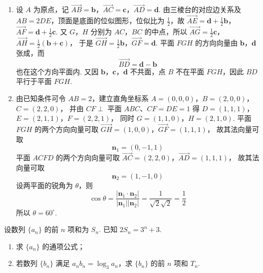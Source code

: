 \begin{solution}
\begin{enumerate}
\item 设 \(A\) 为原点，记
\(\overrightarrow{AB}=\mathbf b\)，\(\overrightarrow{AC}=\mathbf c\)，\(\overrightarrow{AD}=\mathbf d\).
由三棱台的对应边关系及 \(AB=2DE\)，顶面是底面的位似图形，位似比为 \(\frac12\)，故
\(\overrightarrow{AE}=\mathbf d+\frac12\mathbf b\)，\(\overrightarrow{AF}=\mathbf d+\frac12\mathbf c\).
又 \(G\)，\(H\) 分别为 \(AC\)，\(BC\) 的中点，所以
\(\overrightarrow{AG}=\frac12\mathbf c\)，\(\overrightarrow{AH}=\frac12(\mathbf b+\mathbf c)\)，
于是
\(\overrightarrow{GH}=\frac12\mathbf b\)，\(\overrightarrow{GF}=\mathbf d\).
平面 \(FGH\) 的方向向量由 \(\mathbf b\)，\(\mathbf d\) 张成，而
\[
\overrightarrow{BD}=\mathbf d-\mathbf b
\]
也在这个方向平面内. 又因 \(\mathbf b\)，\(\mathbf c\)，\(\mathbf d\) 不共面，点 \(B\) 不在平面 \(FGH\)，因此 \(BD\) 平行于平面 \(FGH\).
\item 由已知条件可令 \(AB=2\)，建立直角坐标系
\(A=(0,0,0)\)，\(B=(2,0,0)\)，\(C=(2,2,0)\)，
并由 \(CF\perp\) 平面 \(ABC\)、\(CF=DE=1\) 得
\(D=(1,1,1)\)，\(E=(2,1,1)\)，\(F=(2,2,1)\)，
同时
\(G=(1,1,0)\)，\(H=(2,1,0)\).
平面 \(FGH\) 的两个方向向量可取
\(\overrightarrow{GH}=(1,0,0)\)，\(\overrightarrow{GF}=(1,1,1)\)，
故其法向量可取
\[
\mathbf n_1=(0,-1,1)
\]
平面 \(ACFD\) 的两个方向向量可取
\(\overrightarrow{AC}=(2,2,0)\)，\(\overrightarrow{AD}=(1,1,1)\)，
故其法向量可取
\[
\mathbf n_2=(1,-1,0)
\]
设两平面的锐角为 \(\theta\)，则
\[
\cos\theta=\frac{|\mathbf n_1\cdot\mathbf n_2|}{|\mathbf n_1||\mathbf n_2|}
=\frac1{\sqrt2\sqrt2}=\frac12
\]
所以 \(\theta=60^\circ\).
\end{enumerate}
\end{solution}

\begin{problem}
设数列 \(\{a_n\}\) 的前 \(n\) 项和为 \(S_n\). 已知 \(2S_n = 3^n + 3\).
\begin{enumerate}
\item 求 \(\{a_n\}\) 的通项公式；
\item 若数列 \(\{b_n\}\) 满足 \(a_n b_n = \log_3 a_n\)，求 \(\{b_n\}\) 的前 \(n\) 项和 \(T_n\).
\end{enumerate}
\end{problem}

